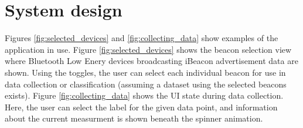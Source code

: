 \chapter{System design}\label{chap:system_design}





Figures \ref{fig:selected_devices} and \ref{fig:collecting_data} show examples of the application in use. 
Figure \ref{fig:selected_devices} shows the beacon selection view where Bluetooth Low Enery devices broadcasting iBeacon advertisement data are shown.
Using the toggles, the user can select each individual beacon for use in data collection or classification (assuming a dataset using the selected beacons exists).
Figure \ref{fig:collecting_data} shows the UI state during data collection.
Here, the user can select the label for the given data point, and information about the current measurment is shown beneath the spinner animation.

